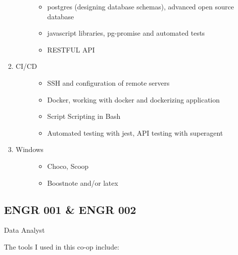 \begin{enumerate}
\begin{description}
\begin{itemize}
  \item
    postgres (designing database schemas), advanced open source database
  \item
    javascript libraries, pg-promise and automated tests
  \item
    RESTFUL API
  \end{itemize}
  \end{description}
\item
  \begin{description}
  \item[CI/CD]
  \begin{itemize}
  
  \item
    SSH and configuration of remote servers
  \item
    Docker, working with docker and dockerizing application
  \item
    Script Scripting in Bash
  \item
    Automated testing with jest, API testing with superagent
  \end{itemize}
  \end{description}
\item
  \begin{description}
  \item[Windows]
  \begin{itemize}
  
  \item
    Choco, Scoop
  \item
    Boostnote and/or latex
  \end{itemize}
  \end{description}
\end{enumerate}


\subsection{ENGR 001 \& ENGR 002}\label{engr-001-engr-002}

Data Analyst

The tools I used in this co-op include:

